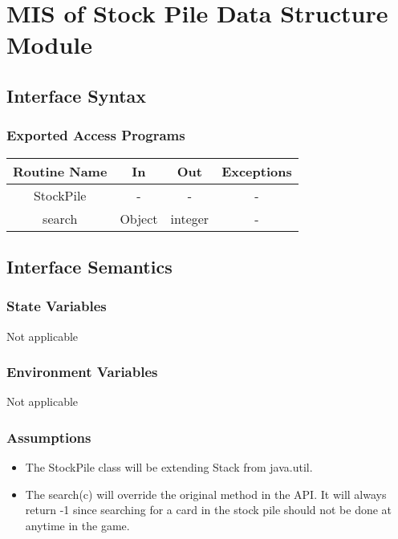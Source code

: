 \documentclass[12pt, titlepage]{article}
\begin{document}
\section{MIS of Stock Pile Data Structure Module}
\subsection{Interface Syntax}
\subsubsection{Exported Access Programs}

\begin{tabular}[pos]{| c | c | c | c |}
    \hline
    \textbf{Routine Name} & \textbf{In} & \textbf{Out} & \textbf{Exceptions}\\
    \hline
    StockPile & - & - & - \\
    \hline
    search & Object & integer & - \\
    \hline
\end{tabular}

\subsection{Interface Semantics}
\subsubsection{State Variables}
Not applicable

\subsubsection{Environment Variables}
Not applicable

\subsubsection{Assumptions}
\begin{itemize}
    \item The StockPile class will be extending Stack from java.util.
    \item The search(c) will override the original method in the API. It will always return -1 since searching for a card in the stock pile should not be done at anytime in the game.
\end{itemize}
\end{document}
